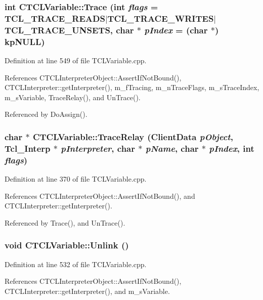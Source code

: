 \subsubsection{\setlength{\rightskip}{0pt plus 5cm}int CTCLVariable::Trace (int {\em flags} = TCL\_\-TRACE\_\-READS$|$TCL\_\-TRACE\_\-WRITES$|$TCL\_\-TRACE\_\-UNSETS, char $\ast$ {\em p\-Index} = (char $\ast$) {\bf kp\-NULL})}\label{classCTCLVariable_a15}




Definition at line 549 of file TCLVariable.cpp.

References CTCLInterpreter\-Object::Assert\-If\-Not\-Bound(), CTCLInterpreter::get\-Interpreter(), m\_\-f\-Tracing, m\_\-n\-Trace\-Flags, m\_\-s\-Trace\-Index, m\_\-s\-Variable, Trace\-Relay(), and Un\-Trace().

Referenced by Do\-Assign().
\subsubsection{\setlength{\rightskip}{0pt plus 5cm}char $\ast$ CTCLVariable::Trace\-Relay (Client\-Data {\em p\-Object}, Tcl\_\-Interp $\ast$ {\em p\-Interpreter}, char $\ast$ {\em p\-Name}, char $\ast$ {\em p\-Index}, int {\em flags})\hspace{0.3cm}{\tt  [static]}}\label{classCTCLVariable_d0}




Definition at line 370 of file TCLVariable.cpp.

References CTCLInterpreter\-Object::Assert\-If\-Not\-Bound(), and CTCLInterpreter::get\-Interpreter().

Referenced by Trace(), and Un\-Trace().
\subsubsection{\setlength{\rightskip}{0pt plus 5cm}void CTCLVariable::Unlink ()}\label{classCTCLVariable_a14}




Definition at line 532 of file TCLVariable.cpp.

References CTCLInterpreter\-Object::Assert\-If\-Not\-Bound(), CTCLInterpreter::get\-Interpreter(), and m\_\-s\-Variable.
